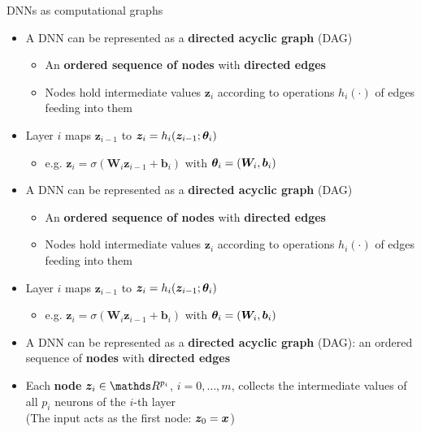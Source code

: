 \documentclass[11pt,compress,t,notes=noshow, xcolor=table]{beamer}
\newcommand{\zv}{\bm{z}}                 %
\begin{document}

\begin{framev}{DNNs as computational graphs}
\begin{itemize}
\item A DNN can be represented as a \textbf{directed acyclic graph} (DAG)
\begin{itemize}
  \item An \textbf{ordered sequence of nodes} with \textbf{directed edges}
  \item Nodes hold intermediate values $\zv_i$ according to operations $h_i(\cdot)$ of edges feeding into them
\end{itemize}
\item Layer $i$ maps $\zv_{i-1}$ to $\zv_i = h_i(\zv_{i-1}; \thetav_i)$
\begin{itemize}
  \item e.g. $\zv_i = \sigma(\bm{W}_i \zv_{i-1} + \bm{b}_i)$ with $\bm{\theta}_i = (\bm{W}_i, \bm{b}_i)$
\end{itemize}
\item A DNN can be represented as a \textbf{directed acyclic graph} (DAG)
\begin{itemize}
  \item An \textbf{ordered sequence of nodes} with \textbf{directed edges}
  \item Nodes hold intermediate values $\zv_i$ according to operations $h_i(\cdot)$ of edges feeding into them
\end{itemize}
\item Layer $i$ maps $\zv_{i-1}$ to $\zv_i = h_i(\zv_{i-1}; \thetav_i)$
\begin{itemize}
  \item e.g. $\zv_i = \sigma(\bm{W}_i \zv_{i-1} + \bm{b}_i)$ with $\bm{\theta}_i = (\bm{W}_i, \bm{b}_i)$
\end{itemize}
\item A DNN can be represented as a \textbf{directed acyclic graph} (DAG): an ordered sequence of \textbf{nodes} with \textbf{directed edges}
\item Each \textbf{node} $\zv_i \in \R^{p_i}$, $i = 0, \ldots, m$, collects the intermediate values of all $p_i$ neurons of the $i$-th layer \\ {\footnotesize(The input acts as the first node: $\zv_0 = \xv$)}

\end{itemize}
\end{framev}
\end{document}
